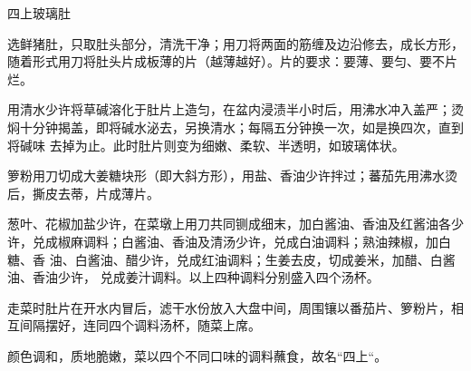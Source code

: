 \begin{recipe}{四上玻璃肚}

\ingredients


\preparation

\step 选鲜猪肚，只取肚头部分，清洗干净；用刀将两面的筋缠及边沿修去，成长方形，
随着形式用刀将肚头片成板薄的片（越薄越好）。片的要求：要薄、要匀、要不片烂。

\step 用清水少许将草碱溶化于肚片上造匀，在盆内浸渍半小时后，用沸水冲入盖严；烫
焖十分钟揭盖，即将碱水泌去，另换清水；每隔五分钟换一次，如是换四次，直到将碱味
去掉为止。此时肚片则变为细嫩、柔软、半透明，如玻璃体状。

\step 箩粉用刀切成大姜糖块形（即大斜方形），用盐、香油少许拌过；蕃茄先用沸水烫
后，撕皮去蒂，片成薄片。

\step 葱叶、花椒加盐少许，在菜墩上用刀共同铡成细末，加白酱油、香油及红酱油各少
许，兑成椒麻调料；白酱油、香油及清汤少许，兑成白油调料；熟油辣椒，加白糖、香
油、白酱油、醋少许，兑成红油调料；生姜去皮，切成姜米，加醋、白酱油、香油少许，
兑成姜汁调料。以上四种调料分别盛入四个汤杯。

\step 走菜时肚片在开水内冒后，滤干水份放入大盘中间，周围镶以番茄片、箩粉片，相
互间隔摆好，连同四个调料汤杯，随菜上席。

\features

颜色调和，质地脆嫩，菜以四个不同口味的调料蘸食，故名“四上“。

\end{recipe}

